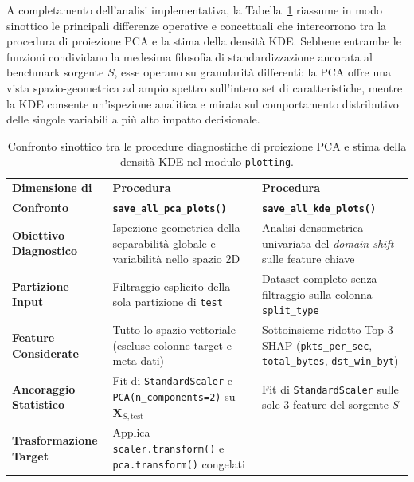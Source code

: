 A completamento dell'analisi implementativa, la Tabella~\ref{tab:confronto_pca_kde} riassume in modo sinottico le principali differenze operative e concettuali che intercorrono tra la procedura di proiezione PCA e la stima della densità KDE. 
Sebbene entrambe le funzioni condividano la medesima filosofia di standardizzazione ancorata al benchmark sorgente $S$, esse operano su granularità differenti: la PCA offre una vista spazio-geometrica ad ampio spettro sull'intero set di caratteristiche, mentre la KDE consente un'ispezione analitica e mirata sul comportamento distributivo delle singole variabili a più alto impatto decisionale.

\begin{table}[H]
    \centering
    \small
    \caption{Confronto sinottico tra le procedure diagnostiche di proiezione PCA e stima della densità KDE nel modulo \texttt{plotting}.}
    \label{tab:confronto_pca_kde}
    \begin{tabularx}{\textwidth}{>{\raggedright\arraybackslash}p{4cm} >{\raggedright\arraybackslash}X >{\raggedright\arraybackslash}X}
        \toprule
        \textbf{Dimensione di} & \textbf{Procedura} & \textbf{Procedura} \\[-5pt]
        \textbf{Confronto} & \textbf{\texttt{save\_all\_pca\_plots()}} & \textbf{\texttt{save\_all\_kde\_plots()}} \\
        \midrule
        \textbf{Obiettivo Diagnostico} & 
        Ispezione geometrica della separabilità globale e variabilità nello spazio 2D & 
        Analisi densometrica univariata del \textit{domain shift} sulle feature chiave \\
        \addlinespace
        \textbf{Partizione Input} & 
        Filtraggio esplicito della sola partizione di \texttt{test} & 
        Dataset completo senza filtraggio sulla colonna \texttt{split\_type} \\
        \addlinespace
        \textbf{Feature Considerate} & 
        Tutto lo spazio vettoriale (escluse colonne target e meta-dati) & 
        Sottoinsieme ridotto Top-3 SHAP (\texttt{pkts\_per\_sec}, \texttt{total\_bytes}, \texttt{dst\_win\_byt}) \\
        \addlinespace
        \textbf{Ancoraggio Statistico} & 
        Fit di \texttt{StandardScaler} e \texttt{PCA(n\_components=2)} su $\mathbf{X}_{S,\mathrm{test}}$ & 
        Fit di \texttt{StandardScaler} sulle sole 3 feature del sorgente $S$ \\
        \addlinespace
        \textbf{Trasformazione Target} & 
        Applica \texttt{scaler.transform()} e \texttt{pca.transform()} congelati & 

\end{tabularx}
\end{table}
